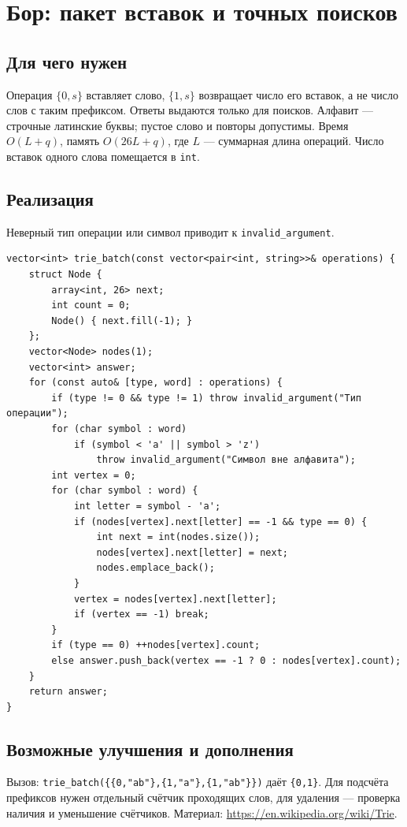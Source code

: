 \clearpage

\iffalse
\section{Бор: пакет вставок и точных поисков}
\subsection*{Для чего нужен}
Операция $\{0,s\}$ вставляет слово, $\{1,s\}$ возвращает число его вставок,
а не число слов с таким префиксом. Ответы выдаются только для поисков.
Алфавит --- строчные латинские буквы; пустое слово и повторы допустимы.
Время $O(L+q)$, память $O(26L+q)$, где $L$ --- суммарная длина операций.
Число вставок одного слова помещается в \texttt{int}.
\subsection*{Реализация}
Неверный тип операции или символ приводит к \texttt{invalid\_argument}.
\begin{lstlisting}[name=supplement_trie]
vector<int> trie_batch(const vector<pair<int, string>>& operations) {
    struct Node {
        array<int, 26> next;
        int count = 0;
        Node() { next.fill(-1); }
    };
    vector<Node> nodes(1);
    vector<int> answer;
    for (const auto& [type, word] : operations) {
        if (type != 0 && type != 1) throw invalid_argument("Тип операции");
        for (char symbol : word)
            if (symbol < 'a' || symbol > 'z')
                throw invalid_argument("Символ вне алфавита");
        int vertex = 0;
        for (char symbol : word) {
            int letter = symbol - 'a';
            if (nodes[vertex].next[letter] == -1 && type == 0) {
                int next = int(nodes.size());
                nodes[vertex].next[letter] = next;
                nodes.emplace_back();
            }
            vertex = nodes[vertex].next[letter];
            if (vertex == -1) break;
        }
        if (type == 0) ++nodes[vertex].count;
        else answer.push_back(vertex == -1 ? 0 : nodes[vertex].count);
    }
    return answer;
}
\end{lstlisting}
\subsection*{Возможные улучшения и дополнения}
Вызов: \texttt{trie\_batch(\{\{0,"ab"\},\{1,"a"\},\{1,"ab"\}\})}
даёт \texttt{\{0,1\}}. Для подсчёта префиксов нужен отдельный счётчик
проходящих слов, для удаления --- проверка наличия и уменьшение счётчиков.
Материал: \url{https://en.wikipedia.org/wiki/Trie}.

